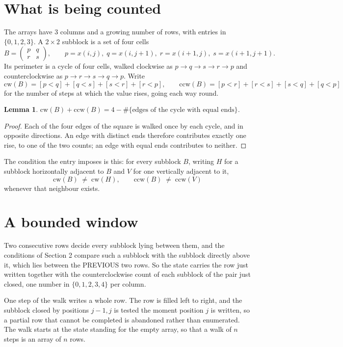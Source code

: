 \documentclass[11pt,a4paper]{article}
\theoremstyle{plain}
\newtheorem{lemma}[theorem]{Lemma}
\theoremstyle{definition}
\begin{document}
\section{What is being counted}

The arrays have $3$ columns and a growing number of rows, with entries in $\{0,1,2,3\}$. A
$2\times2$ subblock is a set of four cells
\[
B=\begin{pmatrix} p & q \\ r & s \end{pmatrix},
\qquad p=x(i,j),\; q=x(i,j+1),\; r=x(i+1,j),\; s=x(i+1,j+1).
\]
Its perimeter is a cycle of four cells, walked clockwise as $p\to q\to s\to r\to p$ and
counterclockwise as $p\to r\to s\to q\to p$. Write
\[
\mathrm{cw}(B)=[p<q]+[q<s]+[s<r]+[r<p],\qquad
\mathrm{ccw}(B)=[p<r]+[r<s]+[s<q]+[q<p]
\]
for the number of steps at which the value rises, going each way round.

\begin{lemma}\label{lem:sum}
$\mathrm{cw}(B)+\mathrm{ccw}(B)=4-\#\{\text{edges of the cycle with equal ends}\}$.
\end{lemma}

\begin{proof}
Each of the four edges of the square is walked once by each cycle, and in opposite directions.
An edge with distinct ends therefore contributes exactly one rise, to one of the two counts;
an edge with equal ends contributes to neither.
\end{proof}

The condition the entry imposes is this: for every subblock $B$, writing $H$ for a subblock horizontally adjacent to $B$ and $V$ for one vertically adjacent to it,
\[
\mathrm{cw}(B)\;\ne\;\mathrm{cw}(H),\qquad \mathrm{ccw}(B)\;\ne\;\mathrm{ccw}(V)
\]
whenever that neighbour exists.

\section{A bounded window}

Two consecutive rows decide every subblock lying between them, and the conditions of Section 2 compare such a subblock with the subblock directly above it, which lies between the PREVIOUS two rows. So the state carries the row just written together with the counterclockwise count of each subblock of the pair just closed, one number in $\{0,1,2,3,4\}$ per column.

One step of the walk writes a whole row. The row is filled left to right, and the subblock
closed by positions $j-1,j$ is tested the moment position $j$ is written, so a partial row that
cannot be completed is abandoned rather than enumerated. The walk starts at the state standing
for the empty array, so that a walk of $n$ steps is an array of $n$ rows.
\end{document}
